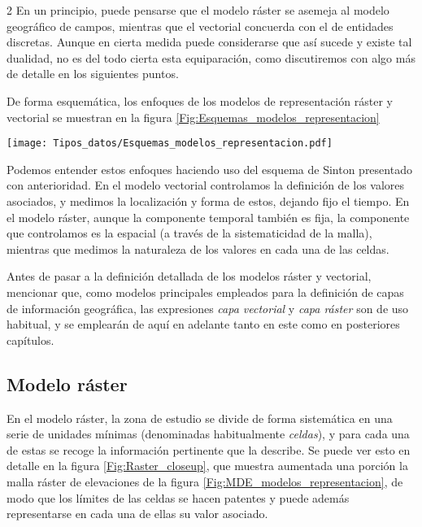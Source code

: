\begin{multicols}{2}
En un principio, puede pensarse que el modelo ráster se asemeja al modelo geográfico de campos, mientras que el vectorial concuerda con el de entidades discretas. Aunque en cierta medida puede considerarse que así sucede y existe tal dualidad, no es del todo cierta esta equiparación, como discutiremos con algo más de detalle en los siguientes puntos.

De forma esquemática, los enfoques de los modelos de representación ráster y vectorial se muestran en la figura \ref{Fig:Esquemas_modelos_representacion}

\begin{figure*}[ht]   
\centering
\texttt{[image: Tipos\_datos/Esquemas\_modelos\_representacion.pdf]}
\caption{\small Comparación entre los esquemas del modelo de representación vectorial (a) y ráster (b).}
\label{Fig:Esquemas_modelos_representacion} 
\end{figure*}

Podemos entender estos enfoques haciendo uso del esquema de Sinton presentado con anterioridad. En el modelo vectorial controlamos la definición de los valores asociados, y medimos la localización y forma de estos, dejando fijo el tiempo. En el modelo ráster, aunque la componente temporal también es fija, la componente que controlamos es la espacial (a través de la sistematicidad de la malla), mientras que medimos la naturaleza de los valores en cada una de las celdas.

Antes de pasar a la definición detallada de los modelos ráster y vectorial, mencionar que, como modelos principales empleados para la definición de capas de información geográfica, las expresiones \emph{capa vectorial} y \emph{capa ráster} son de uso habitual, y se emplearán de aquí en adelante tanto en este como en posteriores capítulos.

\subsection{Modelo ráster}
\label{Modelo_raster}

En el modelo ráster, la zona de estudio se divide de forma sistemática en una serie de unidades mínimas (denominadas habitualmente \emph{celdas}), y para cada una de estas se recoge la información pertinente que la describe.  Se puede ver esto en detalle en la figura \ref{Fig:Raster_closeup}, que muestra aumentada una porción la malla ráster de elevaciones de la figura \ref{Fig:MDE_modelos_representacion}, de modo que los límites de las celdas se hacen patentes y puede además representarse en cada una de ellas su valor asociado.


\end{multicols}

